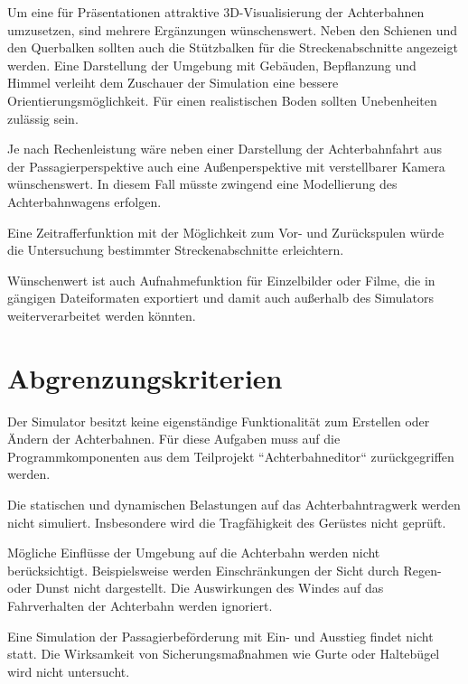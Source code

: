 Um eine für Präsentationen attraktive 3D-Visualisierung der Achterbahnen umzusetzen, sind mehrere Ergänzungen wünschenswert. Neben den Schienen und den Querbalken sollten auch die Stützbalken für die Streckenabschnitte angezeigt werden. Eine Darstellung der Umgebung mit Gebäuden, Bepflanzung und Himmel verleiht dem Zuschauer der Simulation eine bessere Orientierungsmöglichkeit. Für einen realistischen Boden sollten Unebenheiten zulässig sein.

Je nach Rechenleistung wäre neben einer Darstellung der Achterbahnfahrt aus der Passagierperspektive auch eine Außenperspektive mit verstellbarer Kamera wünschenswert. In diesem Fall müsste zwingend eine Modellierung des Achterbahnwagens erfolgen.

Eine Zeitrafferfunktion mit der Möglichkeit zum Vor- und Zurückspulen würde die Untersuchung bestimmter Streckenabschnitte erleichtern.

Wünschenwert ist auch Aufnahmefunktion für Einzelbilder oder Filme, die in gängigen Dateiformaten exportiert und damit auch außerhalb des Simulators weiterverarbeitet werden könnten.

\section{Abgrenzungskriterien}
Der Simulator besitzt keine eigenständige Funktionalität zum Erstellen oder Ändern der Achterbahnen. Für diese Aufgaben muss auf die Programmkomponenten aus dem Teilprojekt ``Achterbahneditor`` zurückgegriffen werden.

Die statischen und dynamischen Belastungen auf das Achterbahntragwerk werden nicht simuliert. Insbesondere wird die Tragfähigkeit des Gerüstes nicht geprüft.

Mögliche Einflüsse der Umgebung auf die Achterbahn werden nicht berücksichtigt. Beispielsweise werden Einschränkungen der Sicht durch Regen- oder Dunst nicht dargestellt. Die Auswirkungen des Windes auf das Fahrverhalten der Achterbahn werden ignoriert.

Eine Simulation der Passagierbeförderung mit Ein- und Ausstieg findet nicht statt. Die Wirksamkeit von Sicherungsmaßnahmen wie Gurte oder Haltebügel wird nicht untersucht. 